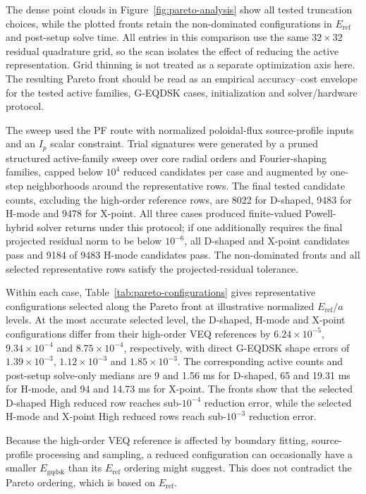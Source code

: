 \documentclass[final, 3p, times]{elsarticle}
\begin{document}
The dense point clouds in Figure~\ref{fig:pareto-analysis} show all tested truncation choices, while the plotted fronts retain the non-dominated configurations in $E_{\mathrm{ref}}$ and post-setup solve time. All entries in this comparison use the same $32\times32$ residual quadrature grid, so the scan isolates the effect of reducing the active representation. Grid thinning is not treated as a separate optimization axis here. The resulting Pareto front should be read as an empirical accuracy--cost envelope for the tested active families, G-EQDSK cases, initialization and solver/hardware protocol.

The sweep used the PF route with normalized poloidal-flux source-profile inputs and an $I_p$ scalar constraint. Trial signatures were generated by a pruned structured active-family sweep over core radial orders and Fourier-shaping families, capped below $10^4$ reduced candidates per case and augmented by one-step neighborhoods around the representative rows. The final tested candidate counts, excluding the high-order reference rows, are 8022 for D-shaped, 9483 for H-mode and 9478 for X-point. All three cases produced finite-valued Powell-hybrid solver returns under this protocol; if one additionally requires the final projected residual norm to be below $10^{-6}$, all D-shaped and X-point candidates pass and 9184 of 9483 H-mode candidates pass. The non-dominated fronts and all selected representative rows satisfy the projected-residual tolerance.

Within each case, Table~\ref{tab:pareto-configurations} gives representative configurations selected along the Pareto front at illustrative normalized $E_{\mathrm{ref}}/a$ levels. At the most accurate selected level, the D-shaped, H-mode and X-point configurations differ from their high-order VEQ references by $6.24\times 10^{-5}$, $9.34\times 10^{-4}$ and $8.75\times 10^{-4}$, respectively, with direct G-EQDSK shape errors of $1.39\times 10^{-3}$, $1.12\times 10^{-3}$ and $1.85\times 10^{-3}$. The corresponding active counts and post-setup solve-only medians are 9 and 1.56 ms for D-shaped, 65 and 19.31 ms for H-mode, and 94 and 14.73 ms for X-point. The fronts show that the selected D-shaped High reduced row reaches sub-$10^{-4}$ reduction error, while the selected H-mode and X-point High reduced rows reach sub-$10^{-3}$ reduction error.

Because the high-order VEQ reference is affected by boundary fitting, source-profile processing and sampling, a reduced configuration can occasionally have a smaller $E_{\mathrm{gqdsk}}$ than its $E_{\mathrm{ref}}$ ordering might suggest. This does not contradict the Pareto ordering, which is based on $E_{\mathrm{ref}}$.
\end{document}
